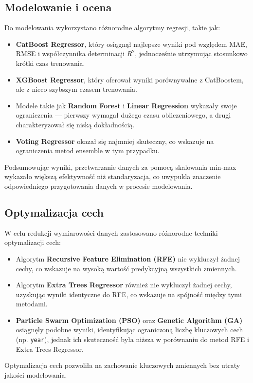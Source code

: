 \documentclass[10pt,letterpaper]{article}
\begin{document}
	\subsection*{Modelowanie i ocena}
	Do modelowania wykorzystano różnorodne algorytmy regresji, takie jak:
	\begin{itemize}
		\item \textbf{CatBoost Regressor}, który osiągnął najlepsze wyniki pod względem MAE, RMSE i współczynnika determinacji $R^2$, jednocześnie utrzymując stosunkowo krótki czas trenowania.
		\item \textbf{XGBoost Regressor}, który oferował wyniki porównywalne z CatBoostem, ale z nieco szybszym czasem trenowania.
		\item Modele takie jak \textbf{Random Forest} i \textbf{Linear Regression} wykazały swoje ograniczenia — pierwszy wymagał dużego czasu obliczeniowego, a drugi charakteryzował się niską dokładnością.
		\item \textbf{Voting Regressor} okazał się najmniej skuteczny, co wskazuje na ograniczenia metod ensemble w tym przypadku.
	\end{itemize}
	Podsumowując wyniki, przetwarzanie danych za pomocą skalowania min-max wykazało większą efektywność niż standaryzacja, co uwypukla znaczenie odpowiedniego przygotowania danych w procesie modelowania.
	
	\subsection*{Optymalizacja cech}
	W celu redukcji wymiarowości danych zastosowano różnorodne techniki optymalizacji cech:
	\begin{itemize}
		\item Algorytm \textbf{Recursive Feature Elimination (RFE)} nie wykluczył żadnej cechy, co wskazuje na wysoką wartość predykcyjną wszystkich zmiennych.
		\item Algorytm \textbf{Extra Trees Regressor} również nie wykluczył żadnej cechy, uzyskując wyniki identyczne do RFE, co wskazuje na spójność między tymi metodami.
		\item \textbf{Particle Swarm Optimization (PSO)} oraz \textbf{Genetic Algorithm (GA)} osiągnęły podobne wyniki, identyfikując ograniczoną liczbę kluczowych cech (np. \texttt{year}), jednak ich skuteczność była niższa w porównaniu do metod RFE i Extra Trees Regressor.
	\end{itemize}
	Optymalizacja cech pozwoliła na zachowanie kluczowych zmiennych bez utraty jakości modelowania.
	
\end{document}
